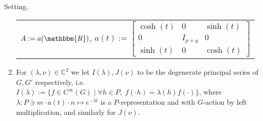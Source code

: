 \documentclass[8pt,notes,notheorems]{beamer}
\newcommand{\assign}{:=}
\theoremstyle{definition}
\theoremstyle{example}
\theoremstyle{plain}
\newenvironment{setting}{\begin{exampleblock}{Setting.}\it}{\end{exampleblock}}
\theoremstyle{mystyle}
\begin{document}
\begin{frame}
\begin{setting}
\begin{enumerate}
\begin{tabular}{l@{}}
    $A \assign a (\mathbbm{R})$, \quad$a (t) \assign \left[ \begin{array}{ccc}
      \cosh (t) & 0 & \sinh (t)\\
      0 & I_{p + q} & 0\\
      \sinh (t) & 0 & \cosh (t)
    \end{array} \right]$
  \end{tabular}
			\item For $(\lambda,\nu)\in\mathbb{C}^2$ we let $I(\lambda),J(\nu)$ to be the degenerate principal series of $G,G'$ respectively, i.e.
$I(\lambda):=\{f\in C^\infty(G)\mid \forall h\in P,\;f(\cdot h)=\lambda(h) f(\cdot)\}$, where $\lambda:P\ni m\cdot a(t)\cdot n\mapsto e^{-\lambda t}$ is a $P$-representation and
with $G$-action by left multiplication, and similarly for $J(\nu)$.
		\end{enumerate}
	\end{setting}
\end{frame}
\begin{frame}
\end{frame}
\end{document}
